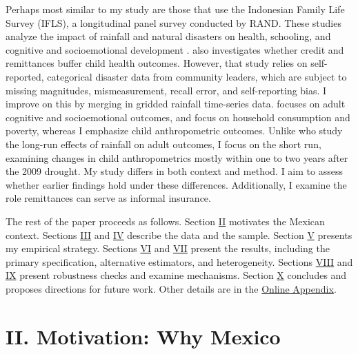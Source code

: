 \documentclass[12pt]{article}
\begin{document}
Perhaps most similar to my study are those that use the Indonesian Family Life Survey (IFLS), a longitudinal panel survey conducted by RAND. These studies analyze the impact of rainfall and natural disasters on health, schooling, and cognitive and socioemotional development \parencite{webbCriticalPeriodsCognitive2024,macciniWeatherHealthSchooling2009,thamarapaniNaturalDisastersChild2021}. \textcite{thamarapaniNaturalDisastersChild2021} also investigates whether credit and remittances buffer child health outcomes. However, that study relies on self-reported, categorical disaster data from community leaders, which are subject to missing magnitudes, mismeasurement, recall error, and self-reporting bias. I improve on this by merging in gridded rainfall time-series data. \textcite{webbCriticalPeriodsCognitive2024} focuses on adult cognitive and socioemotional outcomes, and \textcite{adamsEconomicImpactInternational2010} focus on household consumption and poverty, whereas I emphasize child anthropometric outcomes. Unlike \textcite{macciniWeatherHealthSchooling2009} who study the long-run effects of rainfall on adult outcomes, I focus on the short run, examining changes in child anthropometrics mostly within one to two years after the 2009 drought. My study differs in both context and method. I aim to assess whether earlier findings hold under these differences. Additionally, I examine the role remittances can serve as informal insurance.

The rest of the paper proceeds as follows. Section \hyperref[sec:II]{II} motivates the Mexican context. Sections \hyperref[sec:III]{III} and \hyperref[sec:IV]{IV} describe the data and the sample. Section \hyperref[sec:V]{V} presents my empirical strategy. Sections \hyperref[sec:VI]{VI} and \hyperref[sec:VII]{VII} present the results, including the primary specification, alternative estimators, and heterogeneity. Sections \hyperref[sec:VIII]{VIII} and \hyperref[sec:IX]{IX} present robustness checks and examine mechanisms. Section \hyperref[sec:X]{X} concludes and proposes directions for future work. Other details are in the \href{https://zakserby.github.io/Not-Only-Extremes-How-Moderate-Rainfall-Deficits-Affect-Child-Health-in-Mexico/viewer/web/viewer.html?file=../../Online_Appendix.pdf}{Online Appendix}.

\section*{II. Motivation: Why Mexico}\label{sec:II}
\end{document}
